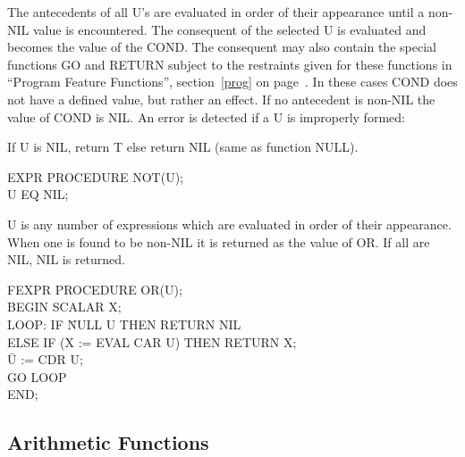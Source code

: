 {The antecedents of all U's are evaluated in order of their appearance
until a non-NIL value is encountered. The consequent of the selected U
is evaluated and becomes the value of the COND. The consequent may
also contain the special functions GO and RETURN subject to the
restraints given for these functions in ``Program Feature Functions'',
section~\ref{prog} on page~\pageref{prog}.
  In these cases COND does
not have a defined value, but rather an effect. If no antecedent is
non-NIL the value of COND is NIL. An error is detected if a U is
improperly formed:

}


{If U is NIL, return T else return NIL (same as function NULL).

{\tt \begin{tabbing} EXPR PROCEDURE NOT(U); \\
\hspace*{1em} U EQ NIL;
\end{tabbing}}
}


{U is any number of expressions which are evaluated in order of their
appearance. When one is found to be non-NIL it is returned as the
value of OR. If all are NIL, NIL is returned.

{\tt \begin{tabbing} FEXPR PROCEDURE OR(U); \\ BEGIN SCALAR X; \\
LOOP: IF \= NULL U THEN RETURN NIL \\
\> ELSE IF (X := EVAL CAR U) THEN RETURN X; \\
\hspace*{2em} \= U := CDR U; \\
\> GO LOOP \\
END;
\end{tabbing} }}


\subsection{Arithmetic Functions}

